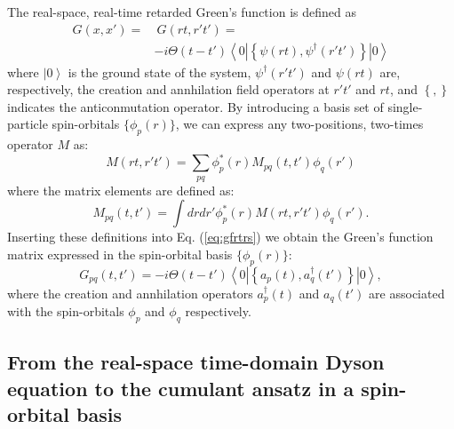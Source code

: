 \documentclass[aps,prb,preprint,groupaddress,floatfix]{revtex4}
\begin{document}
The real-space, real-time retarded Green's function is defined as
\begin{equation}
\label{eq:gfrtrs}
\begin{split}
G(x,x') =& ~ G(rt,r't') = \\
&-i \Theta(t-t')\left<0\left| \left\{\psi(rt), \psi^\dagger(r't') \right\} \right| 0 \right>
\end{split}
\end{equation}
where $\left| 0 \right>$ is the ground state of the system, $\psi^\dagger(r't')$
and $\psi(rt)$ are, respectively, the creation and annhilation field operators
at $r't'$ and $rt$, and $\left\{,\right\}$ indicates the anticonmutation
operator. By introducing a basis set of single-particle spin-orbitals
$\{\phi_p(r)\}$, we can express any two-positions, two-times operator $M$ as:
\begin{equation}
\label{eqn:mel1}
M(rt,r't') = \sum_{pq} \phi^{*}_{p}(r) M_{pq}(t,t') \phi_{q}(r')
\end{equation}
where the matrix elements are defined as:
\begin{equation}
\label{eqn:mel2}
M_{pq}(t,t') = \int dr dr' \phi^{*}_{p}(r) M(rt,r't') \phi_{q}(r').
\end{equation}
Inserting these definitions into Eq. (\ref{eq:gfrtrs}) we obtain the Green's function matrix expressed in the spin-orbital basis $\{\phi_p(r)\}$:
\begin{equation}
\label{eqn:gpq}
G_{pq}(t,t') =
-i \Theta(t-t')
\left<0\left| \left\{a_p(t), a_q^\dagger(t') \right\} \right| 0 \right>,
\end{equation}
where the creation and annhilation operators $a_p^\dagger(t)$ and $a_q(t')$ are
associated with the spin-orbitals $\phi_p$ and $\phi_q$ respectively.

\subsection{From the real-space time-domain Dyson equation to the cumulant ansatz in a spin-orbital basis}
\end{document}
